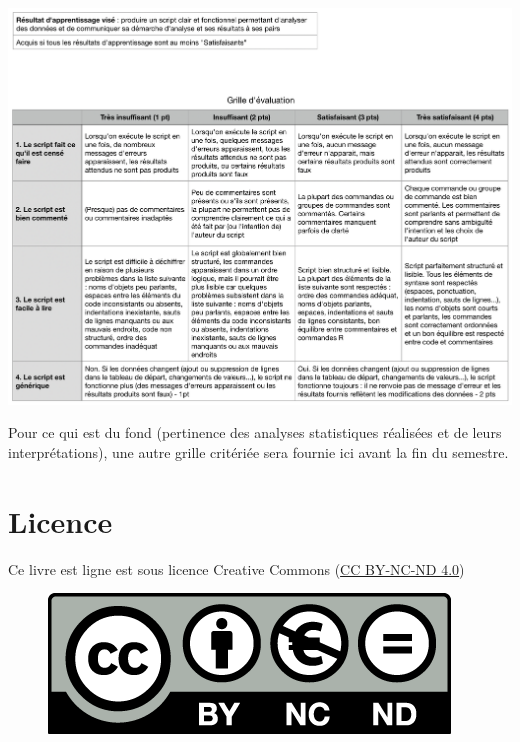 \documentclass[
  a4paper,
  DIV=11,
  numbers=noendperiod,
  oneside]{scrreprt}
\begin{document}
\includegraphics{images/Grille.png}

Pour ce qui est du fond (pertinence des analyses statistiques réalisées
et de leurs interprétations), une autre grille critériée sera fournie
ici avant la fin du semestre.

\hypertarget{licence}{%
\section*{Licence}\label{licence}}


Ce livre est ligne est sous licence Creative Commons
(\href{https://creativecommons.org/licenses/by-nc-nd/4.0/deed.fr}{CC
BY-NC-ND 4.0})

\begin{figure}

{\centering 

\href{https://creativecommons.org/licenses/by-nc-nd/4.0/deed.fr}{\includegraphics{images/cc_licence.png}}

}

\end{figure}
\end{document}
